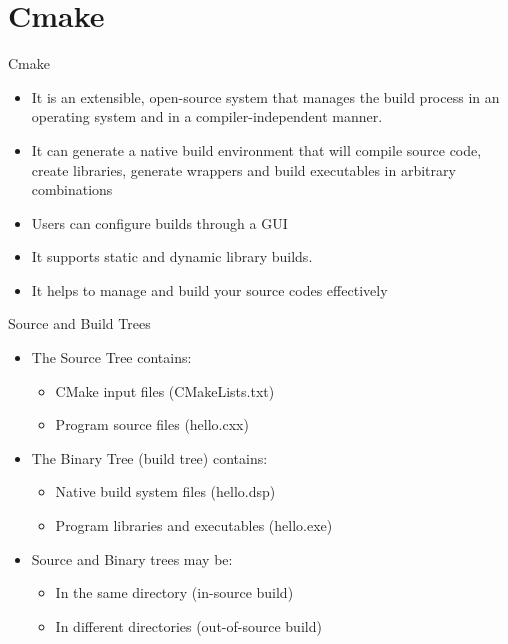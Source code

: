 \documentclass[xcolor=x11names,compress]{beamer}
\renewcommand{\(}{\begin{columns}}
\renewcommand{\)}{\end{columns}}
\newcommand{\<}[1]{\begin{column}{#1}}
\renewcommand{\>}{\end{column}}
\begin{document}
\section{Cmake}
\begin{frame}{Cmake}
	\begin{itemize}
		\item It is an extensible, open-source system that manages the build process in an operating system and in a compiler-independent manner. 
		\item It can generate a native build environment that will compile source code, create libraries, generate wrappers and build executables in arbitrary combinations
		\item Users can configure builds through a GUI
		\item It supports static and dynamic library builds. 
		\item It helps to manage and build your source codes effectively
	\end{itemize}
	\end{frame}
\begin{frame}{	Source and Build Trees		}
	\begin{itemize}				
		\item	The Source Tree contains:
		\begin{itemize}
		\item CMake input files (CMakeLists.txt)
		\item Program source files (hello.cxx)
		\end{itemize}
		\item	The Binary Tree (build tree) contains:
			\begin{itemize}			
		\item Native build system files (hello.dsp)
		\item Program libraries and executables (hello.exe)
		\end{itemize}			
		\item Source and Binary trees may be:
		\begin{itemize}
		\item In the same directory (in-source build)
		\item In different directories (out-of-source build)
		\end{itemize}
	\end{itemize}	
\end{frame}	
\end{document}
